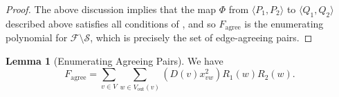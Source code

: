 \documentclass[11pt]{article}
\newcommand{\grp}[1]{\left(#1\right)}
\newcommand{\ca}{\mathcal}
\renewcommand{\t}{\text}
\newcommand{\vout}{V_{\t{out}}}
\newcommand{\agree}{\text{agree}}
\newcommand{\Fagree}{F_{\agree}}
\theoremstyle{definition}
\newtheorem{lemma}[theorem]{Lemma}
\begin{document}
\begin{proof}
    The above discussion implies that the map $\Phi$ from $\langle P_1, P_2\rangle$ to $\langle Q_1, Q_2\rangle$ described above
    satisfies all conditions of , and so $\Fagree$ is the enumerating polynomial for $\ca{F}\setminus\ca{S}$, which is precisely the set of edge-agreeing pairs.
\end{proof}

\begin{lemma}[Enumerating Agreeing Pairs]
\label{enum:agreeing-pairs}
    We have 
        \[\Fagree = 
        \sum_{v\in V}
        \sum_{w\in \vout(v)} \grp{D(v)x_{vw}^2} R_1(w)R_2(w).\]
\end{lemma}
\end{document}
